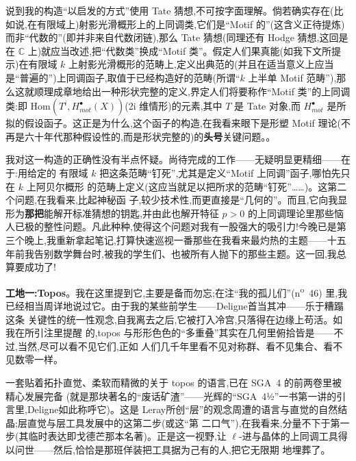 {说到我的构造“以启发的方式”使用 Tate 猜想,不可按字面理解。倘若确实存在(比如说,在有限域上)射影光滑概形上的上同调类,它们是“Motif 的”(这含义正待提炼)而非“代数的”(即并非来自代数闭链),那么 Tate 猜想(同理还有 Hodge 猜想,这回是在 $\mathbb{C}$ 上)就应当改述,把“代数类”换成“Motif 类”。假定人们果真能(如我下文所提示)在有限域 $k$ 上射影光滑概形的范畴上,定义出典范的(并且在适当意义上应当是“普遍的”)上同调函子,取值于已经构造好的范畴(所谓“$k$ 上半单 Motif 范畴”),那么这就顺理成章地给出一种形状完整的定义,界定人们将要称作“Motif 类”的上同调类:即 $\mathrm{Hom}(T^i,H^{\bullet}_{mot}(X))$(2i 维情形)的元素,其中 $T$ 是 Tate 对象,而 $H^{\bullet}_{mot}$ 是所拟的假设函子。这正是为什么,这个函子的构造,在我看来眼下是形塑 Motif 理论(不再是六十年代那种假设性的,而是形状完整的)的\textbf{头号}关键问题。}。

我对这一\dmark{}构造的正确性没有半点怀疑。尚待完成的工作——无疑明显更精细——在于:用给定的
有限域 $k$ 把这条范畴“钉死”,尤其是定义“Motif 上同调”函子,哪怕先只在 $k$ 上阿贝尔概形
的范畴上定义(这应当就足以把所求的范畴“钉死”……)。这第二个问题,在我看来,比起神秘函
子,较少技术性,而更直接是“几何的”。而且,它向我显形为\textbf{那把}能解开标准猜想的钥匙,并由此也解开特征 $p>0$ 的上同调理论里那些恼人已极的整性问题。凡此种种,使得这个问题对我有一股强大的吸引力!今晚已是第三个晚上,我重新拿起笔记,打算快速巡视一番那些在我看来最灼热的主题——十五年前我告别数学舞台时,被我的学生们、也被所有人抛下的那些主题。这一回,我总算要成功了!

\asterisms

\pmark{}\textbf{工地一:Topos}。我在这里提到它,主要是备而勿忘;在注“我的孤儿们”(n\textsuperscript{o}~46)
里,我已经相当周详地说过它。由于我的某些前学生——Deligne首当其冲——乐于糟蹋这条
关键性的统一性观念,自我离去之后,它被打入冷宫,只落得在边缘上苟活。如我在所引注里提醒
的,topos 与形形色色的“多重叠”其实在几何里俯拾皆是——不过,当然,尽可以看不见它们,正如
人们几千年里看不见对称群、看不见集合、看不见数零一样。

一套贴着拓扑直觉、柔软而精微的关于 topos 的语言,已在 SGA~4 的前两卷里被精心发展完备
(就是那块著名的“废话矿渣”——光辉的“SGA~4½”一书第一讲的引言里,Deligne如此称呼它)。这是
Leray所创“层”的观念周遭的语言与直觉的自然结晶;层直觉与层工具发展中的这第二步(或这“第
二口气”),在我看来,分量不下于第一步(其临时表达即戈德芒那本名著)。正是这一视野,让
$\ell$-进与晶体的上同调工具得以问世——然后,恰恰是那班佯装把工具据为己有的人,把它无限期
地埋葬了。

